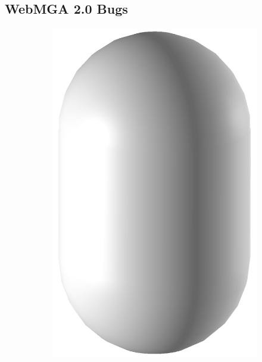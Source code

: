 \subsection{WebMGA 2.0 Bugs}
\begin{figure}
  \begin{center}
    \begin{subfigure}{0.24\textwidth}
    \includegraphics[width=\linewidth]{assets/images/shapes/bugold/bad_mesh_high}
    \caption{}
    \end{subfigure}
      \begin{subfigure}{0.24\textwidth}

\end{subfigure}
\end{center}
\end{figure}
